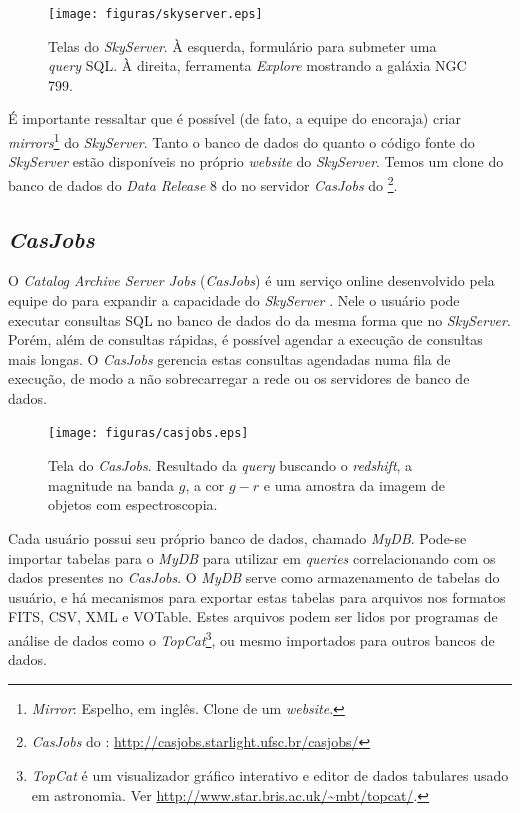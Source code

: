 \begin{figure}
	\texttt{[image: figuras/skyserver.eps]}
	\caption[Telas do {\em SkyServer}.]
	{Telas do {\em SkyServer}. À esquerda, formulário para submeter uma {\em
	query} SQL. À direita, ferramenta {\em Explore} mostrando a galáxia NGC 799.}
	\label{fig:TelaDoSkyServer}
\end{figure}

É importante ressaltar que é possível (de fato, a equipe do \SDSS encoraja)
criar {\em mirrors}\footnote{{\em Mirror}: Espelho, em inglês. Clone de um {\em
website}.} do {\em SkyServer}. Tanto o banco de dados do \SDSS quanto o código
fonte do {\em SkyServer} estão disponíveis no próprio {\em website} do {\em
SkyServer}. Temos um clone do banco de dados do {\em Data Release} 8 do \SDSS no
servidor {\em CasJobs} do \starlight \footnote{{\em CasJobs} do \starlight:
\url{http://casjobs.starlight.ufsc.br/casjobs/}}.

\subsection{{\em CasJobs}}
\label{sec:CrossMatch:SDSS:CasJobs}

O {\em Catalog Archive Server Jobs} ({\em CasJobs}) é um serviço online
desenvolvido pela equipe do \SDSS para expandir a capacidade do {\em SkyServer}
\citep{Li2008}. Nele o usuário pode executar consultas SQL no banco de dados do
\SDSS da mesma forma que no {\em SkyServer}. Porém, além de consultas rápidas, é
possível agendar a execução de consultas mais longas. O {\em CasJobs} gerencia
estas consultas agendadas numa fila de execução, de modo a não sobrecarregar a
rede ou os servidores de banco de dados.

\begin{figure}
	\texttt{[image: figuras/casjobs.eps]}
	\caption[Tela do {\em CasJobs}.]
	{Tela do {\em CasJobs}. Resultado da {\em query} buscando o {\em redshift}, a
	magnitude na banda $g$, a cor $g-r$ e uma amostra da imagem de objetos com
	espectroscopia.}
	\label{fig:CasJobs}
\end{figure}

Cada usuário possui seu próprio banco de dados, chamado {\em MyDB}. Pode-se
importar tabelas para o {\em MyDB} para utilizar em {\em queries}
correlacionando com os dados presentes no {\em CasJobs}. O {\em MyDB} serve como
armazenamento de tabelas do usuário, e há mecanismos para exportar estas tabelas
para arquivos nos formatos FITS, CSV, XML e VOTable. Estes arquivos podem ser
lidos por programas de análise de dados como o {\em TopCat}\footnote{{\em
TopCat} é um visualizador gráfico interativo e editor de dados tabulares usado
em astronomia. Ver \url{http://www.star.bris.ac.uk/~mbt/topcat/}.}, ou mesmo
importados para outros bancos de dados.

